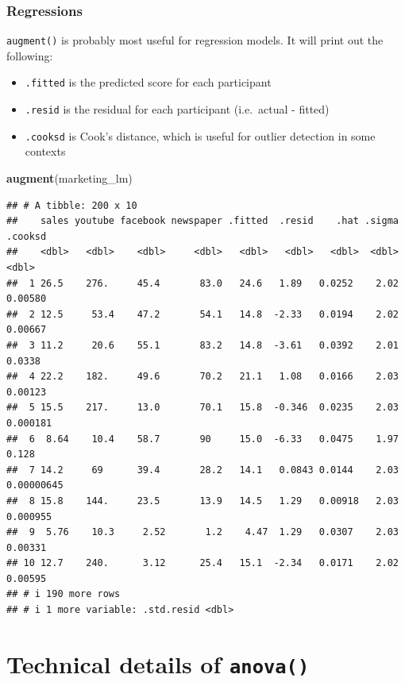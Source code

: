 \documentclass[
]{book}
\newenvironment{Shaded}{\begin{snugshade}}{\end{snugshade}}
\newcommand{\FunctionTok}[1]{\textcolor[rgb]{0.13,0.29,0.53}{\textbf{#1}}}
\newcommand{\NormalTok}[1]{#1}
\providecommand{\tightlist}{%
  \setlength{\itemsep}{0pt}\setlength{\parskip}{0pt}}
\begin{document}
\subsection{Regressions}\label{regressions}

\texttt{augment()} is probably most useful for regression models. It will print out the following:

\begin{itemize}
\tightlist
\item
  \texttt{.fitted} is the predicted score for each participant
\item
  \texttt{.resid} is the residual for each participant (i.e.~actual - fitted)
\item
  \texttt{.cooksd} is Cook's distance, which is useful for outlier detection in some contexts
\end{itemize}

\begin{Shaded}
\begin{Highlighting}[]
\FunctionTok{augment}\NormalTok{(marketing\_lm)}
\end{Highlighting}
\end{Shaded}

\begin{verbatim}
## # A tibble: 200 x 10
##    sales youtube facebook newspaper .fitted  .resid    .hat .sigma    .cooksd
##    <dbl>   <dbl>    <dbl>     <dbl>   <dbl>   <dbl>   <dbl>  <dbl>      <dbl>
##  1 26.5    276.     45.4       83.0   24.6   1.89   0.0252    2.02 0.00580   
##  2 12.5     53.4    47.2       54.1   14.8  -2.33   0.0194    2.02 0.00667   
##  3 11.2     20.6    55.1       83.2   14.8  -3.61   0.0392    2.01 0.0338    
##  4 22.2    182.     49.6       70.2   21.1   1.08   0.0166    2.03 0.00123   
##  5 15.5    217.     13.0       70.1   15.8  -0.346  0.0235    2.03 0.000181  
##  6  8.64    10.4    58.7       90     15.0  -6.33   0.0475    1.97 0.128     
##  7 14.2     69      39.4       28.2   14.1   0.0843 0.0144    2.03 0.00000645
##  8 15.8    144.     23.5       13.9   14.5   1.29   0.00918   2.03 0.000955  
##  9  5.76    10.3     2.52       1.2    4.47  1.29   0.0307    2.03 0.00331   
## 10 12.7    240.      3.12      25.4   15.1  -2.34   0.0171    2.02 0.00595   
## # i 190 more rows
## # i 1 more variable: .std.resid <dbl>
\end{verbatim}

\chapter{\texorpdfstring{Technical details of \texttt{anova()}}{Technical details of anova()}}\label{technical-details-of-anova}
\end{document}
